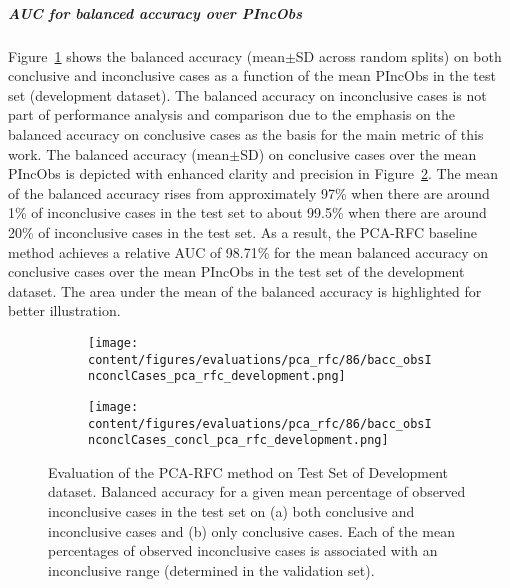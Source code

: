 \subparagraph{AUC for balanced accuracy over PIncObs}

Figure~\ref{fig:bacc_obsInconclCases_pca_rfc_development} shows the balanced accuracy (mean$\pm$SD across random splits) 
on both conclusive and inconclusive cases as a function of the mean PIncObs
in the test set (development dataset).
The balanced accuracy on inconclusive cases is not part of performance analysis and comparison 
due to the emphasis on the balanced accuracy on conclusive cases as the basis for the main metric of this work.
The balanced accuracy (mean$\pm$SD) on conclusive cases over the mean PIncObs
is depicted with enhanced clarity and precision in Figure~\ref{fig:bacc_obsInconclCases_concl_pca_rfc_development}.
The mean of the balanced accuracy rises from approximately 97\% 
when there are around 1\% of inconclusive cases in the test set to about 99.5\% 
when there are around 20\% of inconclusive cases in the test set.
As a result, the PCA-RFC baseline method achieves a relative AUC of 98.71\% for the mean balanced accuracy on conclusive cases
over the mean PIncObs in the test set of the development dataset.
The area under the mean of the balanced accuracy is highlighted for better illustration.


\begin{figure}[ht]
  \begin{subfigure}{0.9\textwidth}
    \centering
    \texttt{[image: content/figures/evaluations/pca\_rfc/86/bacc\_obsInconclCases\_pca\_rfc\_development.png]}
    \subcaption{}
    \label{fig:bacc_obsInconclCases_pca_rfc_development}
  \end{subfigure}
  \hfill
  \begin{subfigure}{0.9\textwidth}
    \centering
    \texttt{[image: content/figures/evaluations/pca\_rfc/86/bacc\_obsInconclCases\_concl\_pca\_rfc\_development.png]}
    \subcaption{}
    \label{fig:bacc_obsInconclCases_concl_pca_rfc_development}
  \end{subfigure}

  \caption{Evaluation of the PCA-RFC method on Test Set of Development dataset.
  Balanced accuracy for a given mean percentage of observed inconclusive cases in the test set on 
  (a) both conclusive and inconclusive cases and (b) only conclusive cases. 
  Each of the mean percentages of observed inconclusive cases is associated with an inconclusive range (determined in the validation set). }
  \label{fig:bacc_obsInconclCases_pca_rfc_development_full}
\end{figure}

